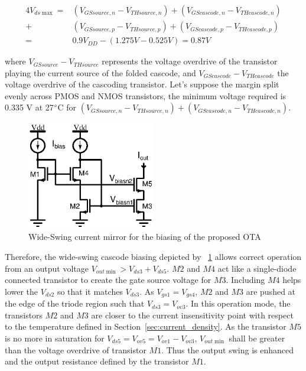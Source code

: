 \begin{eqnarray}
    4V_{ds\max} =& (V_{GSsource,n}-V_{THsource,n}) + (V_{GScascode,n}-V_{THcascode,n}) \\
    +& (V_{GSsource,p}-V_{THsource,p}) + (V_{GScascode,p}-V_{THcascode,p}) \nonumber \\
    =& 0.9 V_{DD} - (1.275 V - 0.525 V) = 0.87 V \nonumber
\end{eqnarray}
    
where \(V_{GSsource}-V_{THsource} \) represents the voltage overdrive of the transistor playing the current source of the folded cascode, and \(V_{GScascode}-V_{THcascode}\) the voltage overdrive of the cascoding transistor. Let's suppose the margin split evenly across PMOS and NMOS transistors, the minimum voltage required is 0.335 V at 27\(\degree \)C for \((V_{GSsource,n}-V_{THsource,n}) + (V_{GScascode,n}-V_{THcascode,n})\).

\begin{figure}[htp]
    \centering
    \includegraphics[width=0.5\textwidth]{Chapter7/Figs/wide-swing-current-mirror.ps}
    \caption{Wide-Swing current mirror for the biasing of the proposed OTA}
    \label{fig:wide-swing-cascode}
\end{figure}

Therefore, the wide-swing cascode biasing depicted by \figurename~\ref{fig:wide-swing-cascode} allows correct operation from an output voltage \(V_{out\min} > V_{ds3}+V_{ds5}\). \(M2 \) and \(M4 \) act like a single-diode connected transistor to create the gate source voltage for \(M3 \). Including \(M4 \) helps lower the \(V_{ds2} \) so that it matches \(V_{ds3} \). As \(V_{gs1} = V_{gs4} \), \(M2 \) and \(M3 \) are pushed at the edge of the triode region such that \(V_{ds3} = V_{ov3}\). In this operation mode, the transistors \(M2 \) and \(M3 \) are closer to the current insensitivity point with respect to the temperature defined in Section~\ref{sec:current_density}. As the transistor \(M5 \) is no more in saturation for \(V_{ds5} = V_{ov5} = V_{ov1} - V_{ov3}\), \(V_{out\min} \) shall be greater than the voltage overdrive of transistor \(M1 \). Thus the output swing is enhanced and the output resistance defined by the transistor \(M1 \).

